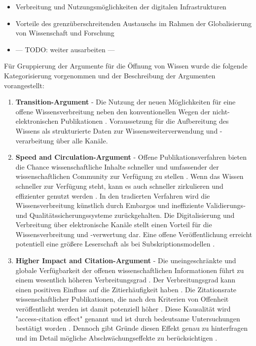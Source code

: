 \begin{itemize}
\item Verbreitung und Nutzungsmöglichkeiten der digitalen Infrastrukturen
\item Vorteile des grenzüberschreitenden Austauschs im Rahmen der Globalisierung von Wissenschaft und Forschung
\item --- TODO: weiter ausarbeiten ---
\end{itemize}

Für Gruppierung der Argumente für die Öffnung von Wissen wurde die folgende Kategorisierung vorgenommen und der Beschreibung der Argumenten vorangestellt:
\begin{enumerate}
\item \textbf{Transition-Argument} - Die Nutzung der neuen Möglichkeiten für eine offene Wissensverbreitung neben den konventionellen Wegen der nicht-elektronischen Publikationen \cite{berliner_erklaerung_2003}. Voraussetzung für die Aufbereitung des Wissens als strukturierte Daten zur Wissensweiterverwendung und -verarbeitung über alle Kanäle.
\item \textbf{Speed and Circulation-Argument} - Offene Publikationsverfahren bieten die Chance wissenschaftliche Inhalte schneller und umfassender der wissenschaftlichen Community zur Verfügung zu stellen \cite{muller_2010_open} \cite{EuropeanCommission_sciencepub_2006}. Wenn das Wissen schneller zur Verfügung steht, kann es auch schneller zirkulieren und effizienter genutzt werden \cite{Woelfle_2011}. In den tradierten Verfahren wird die Wissensverbreitung künstlich durch Embargos und ineffiziente Validierungs- und Qualitätssicherungssysteme zurückgehalten. Die Digitalisierung und Verbreitung über elektronische Kanäle stellt einen Vorteil für die Wissensverbreitung und -verwertung dar. Eine offene Veröffentlichung erreicht potentiell eine größere Leserschaft als bei Subskriptionsmodellen \cite{cope2014future}.
\item \textbf{Higher Impact and Citation-Argument} - Die uneingeschränkte und globale Verfügbarkeit der offenen wissenschaftlichen Informationen führt zu einem wesentlich höheren Verbreitungsgrad \cite{davis_2011_open} \cite{muller_2010_open} \cite{Baggs_2006} \cite{Kurtz2005_oa_citation}. Der Verbreitungsgrad kann einen positiven Einfluss auf die Zitierhäufigkeit haben \cite{muller_2010_open} \cite{EuropeanCommission_sciencepub_2006} \cite{Hajjem_2005}. Die Zitationsrate wissenschaftlicher Publikationen, die nach den Kriterien von Offenheit veröffentlicht werden ist damit potenziell höher \cite{cite:21a}. Diese Kausalität wird "access-citation effect"\cite{davis_2011_open} genannt und ist durch bedeutsame Untersuchungen bestätigt worden \cite{Lawrence_2001} \cite{Jeffrey_2008} \cite{Hajjem_2005} \cite{Eysenbach_2006} \cite{Antelman_2004}. Dennoch gibt Gründe diesen Effekt genau zu hinterfragen und im Detail mögliche Abschwächungseffekte zu berücksichtigen \cite{davis_2011_open} \cite{davis_2008_open}.

\end{enumerate}
